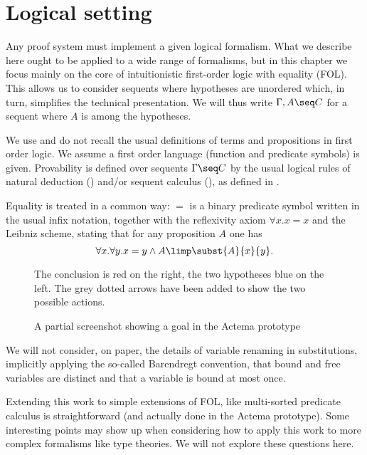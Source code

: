 
\section{Logical setting}

Any proof system must implement a given logical formalism. What we describe here
ought to be applied to a wide range of formalisms, but in this chapter we focus
mainly on the core of intuitionistic first-order logic with equality
(FOL). This allows us to consider sequents where hypotheses are
unordered which, in turn, simplifies the technical presentation. We will thus
write $\Gamma,A \seq C$ for a sequent where $A$ is among the hypotheses.

We use and do not recall the usual definitions of terms and propositions in
first order logic. We assume a first order language (function and predicate
symbols) is given. Provability is defined over sequents $\Gamma\seq C$ by the
usual logical rules of natural deduction () and/or sequent calculus
(), as defined in .

Equality is treated in a common way: $=$ is a binary
predicate symbol written in the usual infix notation, together with the
reflexivity axiom $\forall x.x=x$ and the Leibniz scheme, stating that for any
proposition $A$ one has
$$\forall x.\forall y. x=y\land A \limp \subst{A}{x}{y}.$$

\begin{figure*}
 \begin{center}
 \end{center}
 The conclusion is red on the right, the two hypotheses blue on the left. The
 grey dotted arrows have been added to show the two possible actions.
 \caption{A partial screenshot showing a goal in the Actema prototype}
 \end{figure*}

We will not consider, on paper, the details of variable renaming in
substitutions, implicitly applying the so-called Barendregt
convention, that bound and free variables are distinct and that a
variable is bound at most once.

Extending this work to simple extensions of FOL, like multi-sorted predicate
calculus is straightforward (and actually done in the Actema prototype).  Some
interesting points may show up when considering how to apply this work to more
complex formalisms like type theories. We will not explore these questions here.

